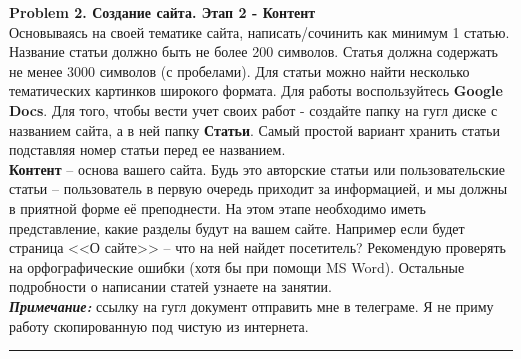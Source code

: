 \documentclass[a4paper, 11pt]{extarticle}
\newenvironment{problem}[2][Problem]
    { \begin{mdframed}[backgroundcolor=gray!20] \textbf{#1 #2} \\}
    {  \end{mdframed}}
\begin{document}

\begin{problem}{2. Создание сайта. Этап 2 - Контент}
Основываясь на своей тематике сайта, написать/сочинить как минимум 1 статью. Название статьи должно быть не более 200 символов. Статья должна содержать не менее 3000 символов (с пробелами). Для статьи можно найти несколько тематических картинков широкого формата. Для работы воспользуйтесь \textbf{Google Docs}. Для того, чтобы вести учет своих работ - создайте папку на гугл диске с названием сайта, а в ней папку \textbf{Статьи}. Самый простой вариант хранить статьи подставляя номер статьи перед ее названием. \\
\textbf{Контент} -- основа вашего сайта. Будь это авторские статьи или пользовательские статьи -- пользователь в первую очередь приходит за информацией, и мы должны в приятной форме её преподнести.
На этом этапе необходимо иметь представление, какие разделы будут на вашем сайте. Например если будет страница <<О сайте>> -- что на ней найдет посетитель?
Рекомендую проверять на орфографические ошибки (хотя бы при помощи MS Word). Остальные подробности о написании статей узнаете на занятии.\\
\textit{\textbf{Примечание:}} ссылку на гугл документ отправить мне в телеграме. Я не приму работу скопированную под чистую из интернета.
\end{problem}
\noindent\rule{6.257in}{2.8pt}
\end{document}
